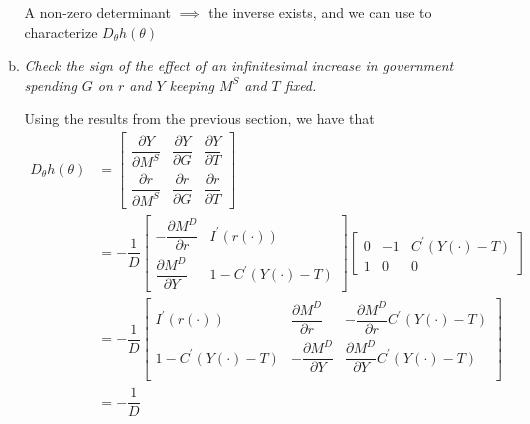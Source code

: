 \documentclass{article}
\begin{document}
\begin{enumerate}[1.]
\begin{enumerate}[a)]
        A non-zero determinant $\implies$ the inverse exists, and we can use  to characterize $D_\theta h(\theta)$

      \item \textit{Check the sign of the effect of an infinitesimal increase in government spending $G$ on $r$ and $Y$ keeping $M^S$ and $T$ fixed.}

        \solution Using the results from the previous section, we have that
        \begin{align*}
          D_\theta h(\theta)
          & =
          \left[\begin{matrix}
              \dfrac{\partial Y}{\partial M^S}
            & \dfrac{\partial Y}{\partial G}
            & \dfrac{\partial Y}{\partial T} \\[6pt]
              \dfrac{\partial r}{\partial M^S}
            & \dfrac{\partial r}{\partial G}
            & \dfrac{\partial r}{\partial T}
          \end{matrix}\right]
          \\[6pt]
          & =
            -\dfrac{1}{D}
            \left[\begin{matrix}
                - \dfrac{\partial M^D}{\partial r}
              & I^\prime(r(\cdot)) \\[6pt]
                \dfrac{\partial M^D}{\partial Y}
              & 1 - C^\prime(Y(\cdot) - T)
            \end{matrix}\right]
            \left[\begin{matrix}
                0
              & -1
              & C^\prime(Y(\cdot) - T) \\[6pt]
                1
              & 0
              & 0
            \end{matrix}\right]
          \\[6pt]
          & =
          - \dfrac{1}{D}
          \left[\begin{matrix}
                I^\prime(r(\cdot))
            &   \dfrac{\partial M^D}{\partial r}
            & - \dfrac{\partial M^D}{\partial r} C^\prime(Y(\cdot) - T)
            \\[6pt]
                1 - C^\prime(Y(\cdot) - T)
            & - \dfrac{\partial M^D}{\partial Y}
            &   \dfrac{\partial M^D}{\partial Y} C^\prime(Y(\cdot) - T)
            \\[6pt]
          \end{matrix}\right] \\
          & =
          - \dfrac{1}{D}

\end{align*}
\end{enumerate}
\end{enumerate}
\end{document}
